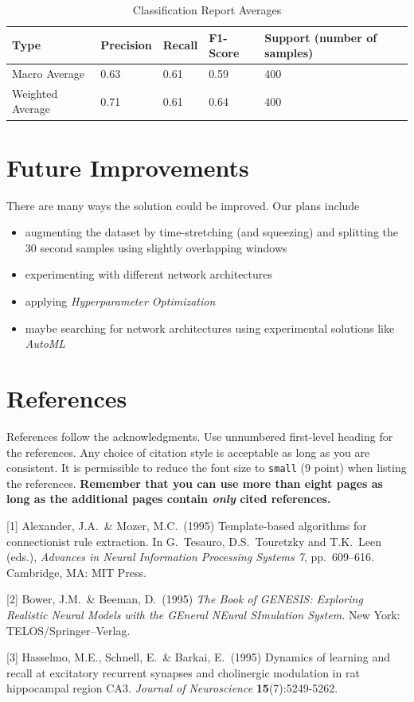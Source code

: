 \documentclass{article}
\begin{document}
    \begin{table}[h]
        \caption{Classification Report Averages}
        \centering
        \begin{tabular}{l | l l l l}
            Type & Precision & Recall & F1-Score & Support (number of samples) \\
            \midrule
            Macro Average & 0.63 & 0.61 & 0.59 & 400 \\
            Weighted Average & 0.71 & 0.61 & 0.64 & 400 \\
            \bottomrule
        \end{tabular}
    \end{table}

    \section{Future Improvements}

    There are many ways the solution could be improved. Our plans include

    \begin{itemize}
        \item augmenting the dataset by time-stretching (and squeezing) and splitting the 30 second
        samples using slightly overlapping windows
        \item experimenting with different network architectures
        \item applying \emph{Hyperparameter Optimization}
        \item maybe searching for network architectures using experimental solutions like \emph{AutoML}
    \end{itemize}


    \section*{References}

    References follow the acknowledgments. Use unnumbered first-level heading for
    the references. Any choice of citation style is acceptable as long as you are
    consistent. It is permissible to reduce the font size to \verb+small+ (9 point)
    when listing the references. {\bf Remember that you can use more than eight
    pages as long as the additional pages contain \emph{only} cited references.}
    \medskip

    \small

    [1] Alexander, J.A.\ \& Mozer, M.C.\ (1995) Template-based algorithms for
    connectionist rule extraction. In G.\ Tesauro, D.S.\ Touretzky and T.K.\ Leen
    (eds.), {\it Advances in Neural Information Processing Systems 7},
    pp.\ 609--616. Cambridge, MA: MIT Press.

    [2] Bower, J.M.\ \& Beeman, D.\ (1995) {\it The Book of GENESIS: Exploring
    Realistic Neural Models with the GEneral NEural SImulation System.}  New York:
    TELOS/Springer--Verlag.

    [3] Hasselmo, M.E., Schnell, E.\ \& Barkai, E.\ (1995) Dynamics of learning and
    recall at excitatory recurrent synapses and cholinergic modulation in rat
    hippocampal region CA3. {\it Journal of Neuroscience} {\bf 15}(7):5249-5262.
\end{document}
